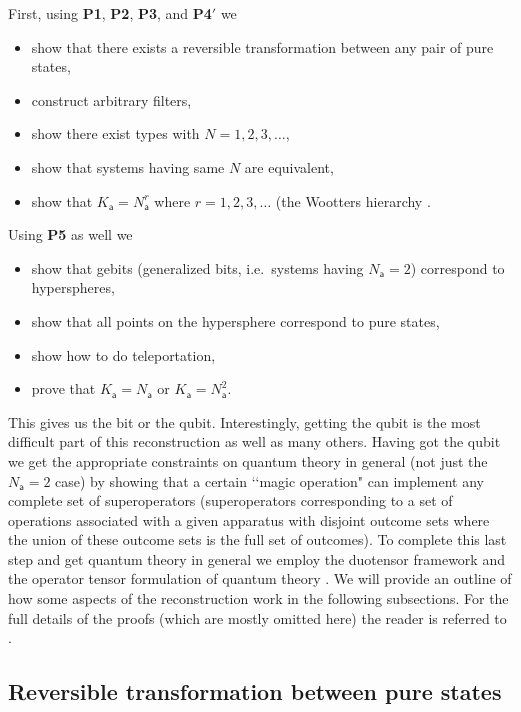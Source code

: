 \documentclass[10pt]{article}
\begin{document}
First, using {\bf P1}, {\bf P2}, {\bf P3}, and {\bf P4$'$} we
\begin{itemize}
\item show that there exists a reversible transformation between any pair of pure states,
\item construct arbitrary filters,
\item show there exist types with $N=1, 2, 3, \dots$,
\item show that systems having same $N$ are equivalent,
\item show that $K_\mathsf{a}=N^r_\mathsf{a}$ where $r=1, 2, 3, \dots$ (the Wootters hierarchy \cite{wootters1986quantum, wootters1990local}.
\end{itemize}
Using {\bf P5} as well we 
\begin{itemize}
\item show that gebits (generalized bits, i.e.\ systems having $N_\mathsf{a}=2$) correspond to hyperspheres,
\item show that all points on the hypersphere correspond to pure states,
\item show how to do teleportation,
\item prove that $K_\mathsf{a}=N_\mathsf{a}$ or $K_\mathsf{a}=N^2_\mathsf{a}$.
\end{itemize}
This gives us the bit or the qubit.  Interestingly, getting the qubit is the most difficult part of this reconstruction as well as many others.  Having got the qubit we get the appropriate constraints on quantum theory in general (not just the $N_\mathsf{a}=2$ case) by showing that a certain \lq\lq magic operation" can implement any complete set of superoperators (superoperators corresponding to a set of operations associated with a given apparatus with disjoint outcome sets where the union of these outcome sets is the full set of outcomes).  To complete this last step and get quantum theory in general we employ the duotensor framework \cite{hardy2010formalism} and the operator tensor formulation of quantum theory \cite{hardy2011reformulating, hardy2012operator}.  We will provide an outline of how some aspects of the reconstruction work in the following subsections.  For the full details of the proofs (which are mostly omitted here) the reader is referred to \cite{hardy2011reformulating}.





\subsection{Reversible transformation between pure states}
\end{document}
